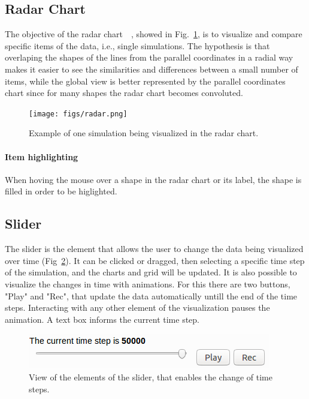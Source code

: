\documentclass[10pt, conference]{IEEEtran}
\begin{document}
\subsection{Radar Chart}

The objective of the radar chart~\cite{saary2008radar}~\cite{mosley1999benchmarking}, showed in Fig.~\ref{fig:radar}, is to visualize and compare specific items of the data, i.e., single simulations. The hypothesis is that overlaping the shapes of the lines from the parallel coordinates in a radial way makes it easier to see the similarities and differences between a small number of items, while the global view is better represented by the parallel coordinates chart since for many shapes the radar chart becomes convoluted.  

\begin{figure}
\texttt{[image: figs/radar.png]}
\caption{Example of one simulation being visualized in the radar chart.} 
\label{fig:radar}
\end{figure}
\paragraph*{Item highlighting} When hoving the mouse over a shape in the radar chart or its label, the shape is filled in order to be higlighted.

\subsection{Slider}

The slider is the element that allows the user to change the data being visualized over time (Fig~\ref{fig:slider}). It can be clicked or dragged, then selecting a specific time step of the simulation, and the charts and grid will be updated. It is also possible to visualize the changes in time with animations. For this there are two buttons, "Play" and "Rec", that update the data automatically untill the end of the time steps. Interacting with any other element of the visualization pauses the animation. A text box informs the current time step.

\begin{figure}
\includegraphics[width=0.8\linewidth]{figs/slider.png}
\caption{View of the elements of the slider, that enables the change of time steps.} 
\label{fig:slider}
\end{figure}
\end{document}
